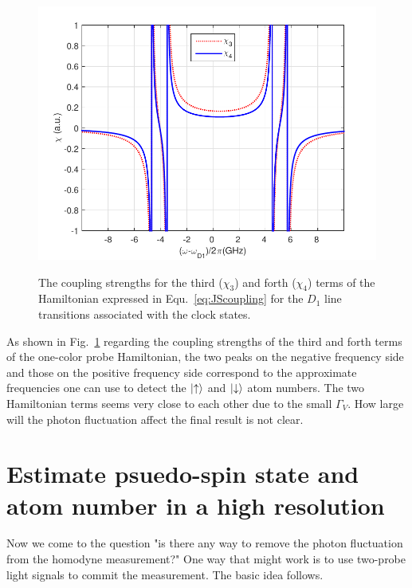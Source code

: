 \begin{figure}
\begin{minipage}{.91\linewidth}
\centering
{\includegraphics[scale=0.75]{../media/Figs/chi34}}
\end{minipage}
\caption{The coupling strengths for the third ($ \chi_3 $) and forth ($ \chi_4 $) terms of the Hamiltonian expressed in Equ.~\eqref{eq:JScoupling} for the $ D_1 $ line transitions associated with the clock states.} \label{fig:chi34}
\end{figure}

As shown in Fig.~\ref{fig:chi34} regarding the coupling strengths of the third and forth terms of the one-color probe Hamiltonian, the two peaks on the negative frequency side and those on the positive frequency side correspond to the approximate frequencies one can use to detect the $ \lvert{\uparrow}\rangle $ and $ \lvert{\downarrow}\rangle $ atom numbers. The two Hamiltonian terms seems very close to each other due to the small $ \Gamma_V $. How large will the photon fluctuation affect the final result is not clear. 

\newpage

\section{Estimate psuedo-spin state and atom number in a high resolution}
Now we come to the question "is there any way to remove the photon fluctuation from the homodyne measurement?" One way that might work is to use two-probe light signals to commit the measurement. The basic idea follows. 

